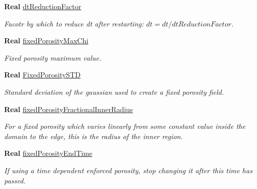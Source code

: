 \begin{DoxyCompactItemize}
\textbf{ Real} \hyperlink{struct_mushy_layer_options_a7f427164689a4cbf14082bad6bbcf888}{dt\+Reduction\+Factor}
\begin{DoxyCompactList}\small\item\em Facotr by which to reduce dt after restarting\+: $ dt = dt / dtReductionFactor $. \end{DoxyCompactList}\item 
\mbox{\label{struct_mushy_layer_options_a5b8ba48579239f92a7f72f3d82ef48dd}} 
\textbf{ Real} \hyperlink{struct_mushy_layer_options_a5b8ba48579239f92a7f72f3d82ef48dd}{fixed\+Porosity\+Max\+Chi}
\begin{DoxyCompactList}\small\item\em Fixed porosity maximum value. \end{DoxyCompactList}\item 
\mbox{\label{struct_mushy_layer_options_a74cedccfecb3321ad61e2394fab36d83}} 
\textbf{ Real} \hyperlink{struct_mushy_layer_options_a74cedccfecb3321ad61e2394fab36d83}{Fixed\+Porosity\+S\+TD}
\begin{DoxyCompactList}\small\item\em Standard deviation of the gaussian used to create a fixed porosity field. \end{DoxyCompactList}\item 
\mbox{\label{struct_mushy_layer_options_afb7d1a06a3a576cd4a006f40d4273575}} 
\textbf{ Real} \hyperlink{struct_mushy_layer_options_afb7d1a06a3a576cd4a006f40d4273575}{fixed\+Porosity\+Fractional\+Inner\+Radius}
\begin{DoxyCompactList}\small\item\em For a fixed porosity which varies linearly from some constant value inside the domain to the edge, this is the radius of the inner region. \end{DoxyCompactList}\item 
\mbox{\label{struct_mushy_layer_options_ac803c6533d24a55850f9aca36a06538a}} 
\textbf{ Real} \hyperlink{struct_mushy_layer_options_ac803c6533d24a55850f9aca36a06538a}{fixed\+Porosity\+End\+Time}
\begin{DoxyCompactList}\small\item\em If using a time dependent enforced porosity, stop changing it after this time has passed. \end{DoxyCompactList}\item 

\end{DoxyCompactItemize}
